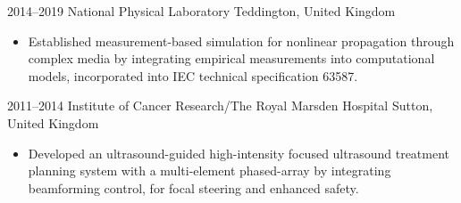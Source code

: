 \documentclass[english, print]{cv-style-wide}
\begin{document}
\begin{entrylist}

\entry
  {2014--2019}
  {National Physical Laboratory}
  {Teddington, United Kingdom}
  {
  \begin{itemize}
\item Established measurement-based simulation for nonlinear propagation through complex media by integrating empirical measurements into computational models, incorporated into IEC technical specification 63587.
  \end{itemize}}


\entry
  {2011--2014}
  {Institute of Cancer Research/The Royal Marsden Hospital}
  {Sutton, United Kingdom}
  {
    \begin{itemize}
    \item Developed an ultrasound-guided high-intensity focused ultrasound treatment planning system with a multi-element phased-array by integrating beamforming control, for focal steering and enhanced safety.
    \end{itemize}}


\end{entrylist}
\end{document}
